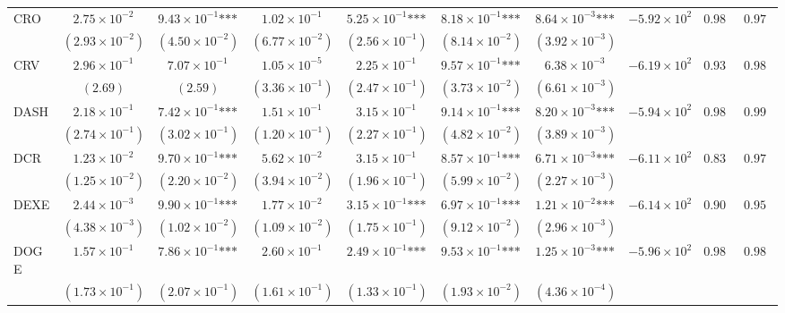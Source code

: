 \documentclass{article}
\begin{document}
\begin{landscape}
\begin{longtable}{lccccccccc}
CRO & $2.75\times 10^{-2}$ & $9.43\times 10^{-1}\text{***}$ & $1.02\times 10^{-1}$ & $5.25\times 10^{-1}\text{***}$ & $8.18\times 10^{-1}\text{***}$ & $8.64\times 10^{-3}\text{***}$ & $-5.92\times 10^{2}$ & $0.987$ & $0.976$ \\
 & $(2.93\times 10^{-2})$ & $(4.50\times 10^{-2})$ & $(6.77\times 10^{-2})$ & $(2.56\times 10^{-1})$ & $(8.14\times 10^{-2})$ & $(3.92\times 10^{-3})$ &  &  &  \\
CRV & $2.96\times 10^{-1}$ & $7.07\times 10^{-1}$ & $1.05\times 10^{-5}$ & $2.25\times 10^{-1}$ & $9.57\times 10^{-1}\text{***}$ & $6.38\times 10^{-3}$ & $-6.19\times 10^{2}$ & $0.938$ & $0.982$ \\
 & $(2.69)$ & $(2.59)$ & $(3.36\times 10^{-1})$ & $(2.47\times 10^{-1})$ & $(3.73\times 10^{-2})$ & $(6.61\times 10^{-3})$ &  &  &  \\
DASH & $2.18\times 10^{-1}$ & $7.42\times 10^{-1}\text{***}$ & $1.51\times 10^{-1}$ & $3.15\times 10^{-1}$ & $9.14\times 10^{-1}\text{***}$ & $8.20\times 10^{-3}\text{***}$ & $-5.94\times 10^{2}$ & $0.989$ & $0.993$ \\
 & $(2.74\times 10^{-1})$ & $(3.02\times 10^{-1})$ & $(1.20\times 10^{-1})$ & $(2.27\times 10^{-1})$ & $(4.82\times 10^{-2})$ & $(3.89\times 10^{-3})$ &  &  &  \\
DCR & $1.23\times 10^{-2}$ & $9.70\times 10^{-1}\text{***}$ & $5.62\times 10^{-2}$ & $3.15\times 10^{-1}$ & $8.57\times 10^{-1}\text{***}$ & $6.71\times 10^{-3}\text{***}$ & $-6.11\times 10^{2}$ & $0.837$ & $0.977$ \\
 & $(1.25\times 10^{-2})$ & $(2.20\times 10^{-2})$ & $(3.94\times 10^{-2})$ & $(1.96\times 10^{-1})$ & $(5.99\times 10^{-2})$ & $(2.27\times 10^{-3})$ &  &  &  \\
DEXE & $2.44\times 10^{-3}$ & $9.90\times 10^{-1}\text{***}$ & $1.77\times 10^{-2}$ & $3.15\times 10^{-1}\text{***}$ & $6.97\times 10^{-1}\text{***}$ & $1.21\times 10^{-2}\text{***}$ & $-6.14\times 10^{2}$ & $0.907$ & $0.950$ \\
 & $(4.38\times 10^{-3})$ & $(1.02\times 10^{-2})$ & $(1.09\times 10^{-2})$ & $(1.75\times 10^{-1})$ & $(9.12\times 10^{-2})$ & $(2.96\times 10^{-3})$ &  &  &  \\
DOGE & $1.57\times 10^{-1}$ & $7.86\times 10^{-1}\text{***}$ & $2.60\times 10^{-1}$ & $2.49\times 10^{-1}\text{***}$ & $9.53\times 10^{-1}\text{***}$ & $1.25\times 10^{-3}\text{***}$ & $-5.96\times 10^{2}$ & $0.985$ & $0.980$ \\
 & $(1.73\times 10^{-1})$ & $(2.07\times 10^{-1})$ & $(1.61\times 10^{-1})$ & $(1.33\times 10^{-1})$ & $(1.93\times 10^{-2})$ & $(4.36\times 10^{-4})$ &  &  &  \\

\end{longtable}
\end{landscape}
\end{document}
